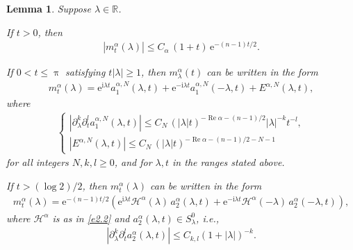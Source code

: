 \documentclass[11pt]{amsproc}
\newcommand{\R}{\mathbb{R}}
\newcommand{\e}{\mathrm{e}}
\newcommand{\0}{\mathbf{0}}
\newcommand{\bc}{{ \mathcal{H} }}
\renewcommand{\Re}{\mathop{\mathrm{Re}}}
\renewcommand{\i}{\mathrm{i}}
\numberwithin{equation}{section}
\numberwithin{figure}{section}
\newtheorem{lem}[thm]{Lemma}
\theoremstyle{definition}
\theoremstyle{remark}
\numberwithin{thm}{section}
\begin{document}
\begin{lem}\label{lem:2.3}
Suppose $\lambda\in\R$.
\begin{asparaenum}[(i)]
\item If $t>0$, then
\begin{eqnarray*}
|m^\alpha_t(\lambda)|\leq C_\alpha \,(1+t)\,\e^{-(n-1) t/2}.
\end{eqnarray*}

\item If $0<t\leq \uppi$ satisfying $t|\lambda|\geq 1$, then $m^\alpha_\lambda(t)$ can be written in the form
\begin{eqnarray}\label{emmm}
m^\alpha_t(\lambda)=\e^{\i\lambda t}a^{\alpha,N}_1(\lambda,t)+\e^{-\i\lambda t}a^{\alpha,N}_1(-\lambda,t)+E^{\alpha,N}(\lambda,t),
\end{eqnarray}
where
\begin{eqnarray}\label{e2.601}
\begin{cases}
\displaystyle|{\partial^k_\lambda}{\partial^l_t}a^{\alpha,N}_1(\lambda,t)|\leq C_N\,(|\lambda|t)^{-\Re \alpha-(n-1)/2}|\lambda|^{-k}t^{-l},\\[4pt]
|E^{\alpha,N}(\lambda,t)|\leq C_N\,(|\lambda|t)^{-\Re\alpha-(n-1)/2-N-1} 
\end{cases}
\end{eqnarray}
for all integers $N, k, l\geq 0$, and for $\lambda, t$ in the ranges stated above.

\item If $t>(\log 2)/2$, then $m^\alpha_t(\lambda)$ can be written in the form
\begin{eqnarray*}
m^\alpha_t(\lambda)=\e^{-(n-1) t/2}\left(\e^{\i\lambda t}\bc^\alpha(\lambda)\,a^\alpha_2(\lambda,t)+\e^{-\i\lambda t}\bc^\alpha(-\lambda)\,a^\alpha_2(-\lambda,t)\right),
\end{eqnarray*}
where $\bc^\alpha$ is as in \eqref{e2.2} and $a^\alpha_2(\lambda,t)\in S^0_\lambda$, i.e.,
\begin{eqnarray*}
|\partial^k_\lambda\partial^l_t a^\alpha_2(\lambda,t)|\leq C_{k,l}(1+|\lambda|)^{-k}.
\end{eqnarray*}
\end{asparaenum}
\end{lem}
\end{document}
